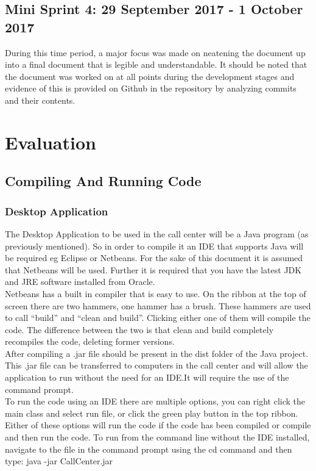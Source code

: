 \documentclass[a4paper,12pt]{article}
\begin{document}
\subsection{Mini Sprint 4: 29 September 2017 - 1 October 2017}
During this time period, a major focus was made on neatening the document up into a final document that is legible and understandable. It should be noted that the document was worked on at all points during the development stages and evidence of this is provided on Github in the repository by analyzing commits and their contents.

\newpage
\section{Evaluation}
\subsection{Compiling And Running Code}
\subsubsection{Desktop Application}
The Desktop Application to be used in the call center will be a Java program (as previously mentioned). So in order to compile it an IDE that supports Java will be required eg Eclipse or Netbeans. For the sake of this document it is assumed that Netbeans will be used. Further it is required that you have the latest JDK and JRE software installed from Oracle.\\
Netbeans has a built in compiler that is easy to use. On the ribbon at the top of screen there are two hammers, one hammer has a brush. These hammers are used to call ``build'' and ``clean and build''. Clicking either one of them will compile the code. The difference between the two is that clean and build completely recompiles the code, deleting former versions.\\
After compiling a .jar file should be present in the dist folder of the Java project. This .jar  file can be transferred to computers in the call center and will allow the application to run without the need for an IDE.It will require the use of the command prompt.\\To run the code using an IDE there are multiple options, you can right click the main class and select run file, or click the green play button in the top ribbon. Either of these options will run the code if the code has been compiled or compile and then run the code. To run from the command line without the IDE installed, navigate to the file in the command prompt using the cd command and then type: java -jar CallCenter.jar
\newpage
\end{document}
